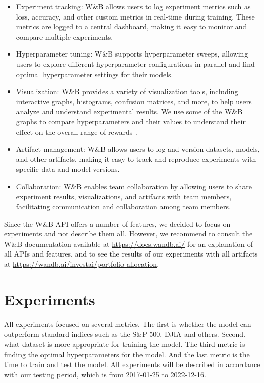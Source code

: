\documentclass[../xlapes02]{subfiles}
\begin{document}
    \begin{itemize}
        \item Experiment tracking: W\&B allows users to log experiment metrics such as loss, accuracy, and other custom metrics in real-time during training. These metrics are logged to a central dashboard, making it easy to monitor and compare multiple experiments.
        \item Hyperparameter tuning: W\&B supports hyperparameter sweeps, allowing users to explore different hyperparameter configurations in parallel and find optimal hyperparameter settings for their models.
        \item Visualization: W\&B provides a variety of visualization tools, including interactive graphs, histograms, confusion matrices, and more, to help users analyze and understand experimental results. We use some of the W\&B graphs to compare hyperparameters and their values to understand their effect on the overall range of rewards~.
        \item Artifact management: W\&B allows users to log and version datasets, models, and other artifacts, making it easy to track and reproduce experiments with specific data and model versions.
        \item Collaboration: W\&B enables team collaboration by allowing users to share experiment results, visualizations, and artifacts with team members, facilitating communication and collaboration among team members.
    \end{itemize}

    Since the W\&B API offers a number of features, we decided to focus on experiments and not describe them all. However, we recommend to consult the W\&B documentation available at \url{https://docs.wandb.ai/} for an explanation of all APIs and features, and to see the results of our experiments with all artifacts at \url{https://wandb.ai/investai/portfolio-allocation}.


    \section{Experiments}\label{sec:experiments}
    All experiments focused on several metrics. The first is whether the model can outperform standard indices such as the S\&P 500, DJIA and others. Second, what dataset is more appropriate for training the model. The third metric is finding the optimal hyperparameters for the model. And the last metric is the time to train and test the model. All experiments will be described in accordance with our testing period, which is from 2017-01-25 to 2022-12-16.
\end{document}
